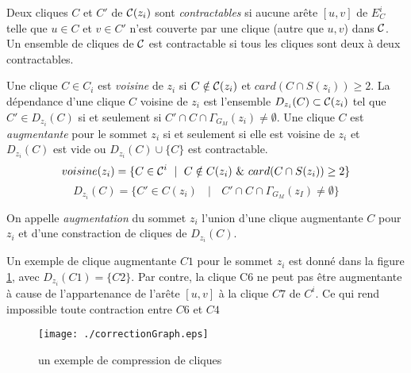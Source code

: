 \begin{definition}
Deux cliques $C$ et $C'$ de ${\cal C}(z_i)$ sont {\em contractables} si aucune ar\^ete $[u,v]$ de $E_C^i$ telle que $u \in C$ et $v \in C'$ n'est couverte par une clique (autre que ${u,v}$) dans $\cal C$.
Un ensemble de cliques de $\cal C$ est contractable si tous les cliques sont deux \`a deux contractables.
\end{definition}

\begin{definition}
Une clique $C \in C_i$ est {\em voisine} de $z_i$ si $C \notin {\cal C}(z_i)$ et $card(C \cap S(z_i)) \ge 2$.
La d\'ependance d'une clique $C$ voisine de $z_i$ est l'ensemble $D_{z_i}(C) \subset {\cal C}(z_i)$ tel que $C' \in D_{z_i}(C)$ si et seulement si  $C' \cap C \cap \Gamma_{G_M}(z_i) \ne \emptyset$.
\newline
Une clique $C$ est {\em augmentante} pour le sommet $z_i$ si et seulement si elle est voisine de $z_i$ et  $D_{z_i}(C)$ est vide  ou $D_{z_i}(C) \cup \{C\}$ est contractable.
\begin{equation}
voisine(z_i) = \{C \in {\cal C}^i \mbox{ } \mid \mbox{ } C \notin C(z_i) \mbox{ } \& \mbox{ } card(C \cap S(z_i)) \ge 2 \} \newline
\end{equation}
\begin{equation}
D_{z_i}(C) = \{ C' \in C(z_i) \mbox{ } \mid  \mbox{ } C' \cap C \cap \Gamma_{G_M}(z_I) \ne \emptyset \}
\end{equation}
\end{definition}

On appelle {\em  augmentation} du sommet $z_i$ l'union d'une clique augmentante  $C$ pour $z_i$ et d'une constraction de cliques de $D_{z_i}(C)$.

Un exemple de clique augmentante $C1$ pour le sommet $z_i$ est donn\'e dans la figure \ref{exempleAlgoCorrectionGraphe}, avec $D_{z_i}(C1) = \{C2\}$.
Par contre, la clique C6 ne peut pas \^etre augmentante \`a cause de l'appartenance de l'ar\^ete $[u,v]$ \`a la clique $C7$ de $C^i$. Ce qui rend impossible toute contraction entre $C6$ et $C4$
\begin{figure}[htb!]
\centering
\texttt{[image: ./correctionGraph.eps]} \vspace{-0.5em}
\caption{un exemple de compression de cliques}
\label{exempleAlgoCorrectionGraphe}
\end{figure}


